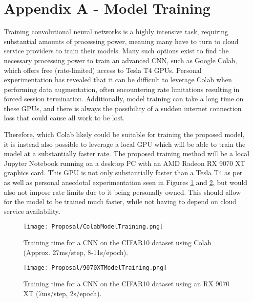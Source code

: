\begingroup
\renewcommand\thechapter{A}
\titleformat{\chapter}[display]
{\normalfont\huge\bfseries}{}{20pt}{\Huge}
\setcounter{section}{0} 
\setcounter{figure}{0}

\chapter*{Appendix A - Model Training}

Training convolutional neural networks is a highly intensive task, requiring substantial amounts of processing power,
meaning many have to turn to cloud service providers to train their models.
Many such options exist to find the necessary processing power to train an advanced CNN, such as Google Colab, which offers 
free (rate-limited) access to Tesla T4 GPUs. Personal experimentation has revealed that it can be difficult to leverage Colab 
when performing data augmentation, often encountering rate limitations resulting in forced session termination. Additionally,
model training can take a long time on these GPUs, and there is always the possibility of a sudden internet connection loss that could 
cause all work to be lost.

\para Therefore, which Colab likely could be suitable for training the proposed model, it is instead also 
possible to leverage a local GPU which will be able to train the model at a substantially faster rate.
The proposed training method will be a local Jupyter Notebook running on a desktop PC with an AMD Radeon RX 9070 XT graphics card.
This GPU is not only substantially faster than a Tesla T4 as per \textcite{hardwaredbTeslaT4Vs,technicalcityRX9070XT} as well as personal 
anecdotal experimentation seen in Figures \ref{fig:GPUComparisonA} and \ref{fig:GPUComparisonB},
but would also not impose rate limits due to it being personally owned. This should allow for the model to be trained much faster, while not 
having to depend on cloud service availability.

\begin{figure}[H]
    \centering
    \texttt{[image: Proposal/ColabModelTraining.png]}
    \caption{Training time for a CNN on the CIFAR10 dataset using Colab (Approx. 27ms/step, 8-11s/epoch).\label{fig:GPUComparisonA}}
\end{figure}

\begin{figure}[H]
    \centering
    \texttt{[image: Proposal/9070XTModelTraining.png]}
    \caption{Training time for a CNN on the CIFAR10 dataset using an RX 9070 XT (7ms/step, 2s/epoch).\label{fig:GPUComparisonB}}
\end{figure}

\endgroup 